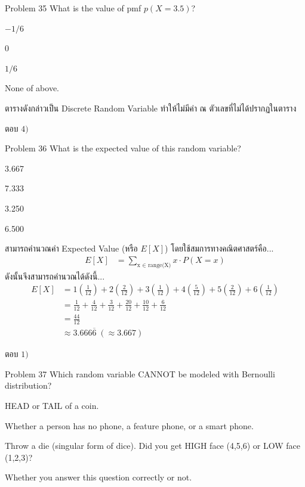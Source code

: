 \documentclass[11pt]{scrartcl}
\begin{document}
\begin{problembox}{Problem 35}
What is the value of pmf $p(X = 3.5)$?
 
\begin{choices}
\item $-1/6$
\item $0$
\item $1/6$
\item None of above.
\end{choices}
\end{problembox}

\begin{solutionbox}
  ตารางดังกล่าวเป็น Discrete Random Variable ทำให้ไม่มีค่า ณ ตัวเลขที่ไม่ได้ปรากฏในตาราง

  ตอบ $\boxed{4)}$
\end{solutionbox}
 
\begin{problembox}{Problem 36}
What is the expected value of this random variable?
 
\begin{choices}
\item 3.667
\item 7.333
\item 3.250
\item 6.500
\end{choices}
\end{problembox}

\begin{solutionbox}
  สามารถคำนวณค่า Expected Value (หรือ $E[X]$) โดยใช้สมการทางคณิตศาสตร์คือ...
  \begin{align*}
    E[X] &= \sum_{\text{x } \in \text{ range(X)}} x \cdot P(X=x)
  \end{align*}
  ดังนั้นจึงสามารถคำนวณได้ดังนี้...
  \begin{align*}
    E[X] &= 1(\frac{1}{12}) + 2(\frac{2}{12}) + 3(\frac{1}{12}) + 4(\frac{5}{12}) + 5(\frac{2}{12}) + 6(\frac{1}{12}) \\
        &= \frac{1}{12} + \frac{4}{12} + \frac{3}{12} + \frac{20}{12} + \frac{10}{12} + \frac{6}{12} \\
        &= \frac{44}{12} \\
        &\approx 3.666\overline{6} \; (\approx 3.667)
  \end{align*}

  ตอบ $\boxed{1)}$
\end{solutionbox}

\begin{problembox}{Problem 37}
Which random variable CANNOT be modeled with Bernoulli distribution?
 
\begin{choices}
\item HEAD or TAIL of a coin.
\item Whether a person has no phone, a feature phone, or a smart phone.
\item Throw a die (singular form of dice). Did you get HIGH face (4,5,6) or LOW face (1,2,3)?
\item Whether you answer this question correctly or not.
\end{choices}
\end{problembox}
 
\end{document}
